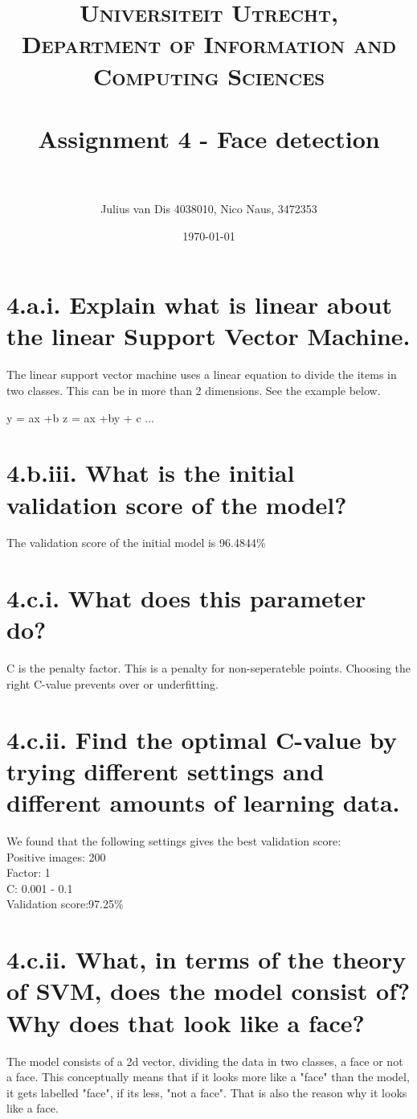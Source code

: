 \documentclass[paper=a4, fontsize=11pt]{scrartcl} %
\title{	
\normalfont \normalsize 
\textsc{Universiteit Utrecht, Department of Information and Computing Sciences} \\ [25pt] %
\horrule{0.5pt} \\[0.4cm] %
\huge Assignment 4 - Face detection \\ %
\horrule{2pt} \\[0.5cm] %
}
\author{Julius van Dis 4038010, Nico Naus, 3472353} %
\date{\normalsize\today} %
\numberwithin{equation}{section} %
\numberwithin{figure}{section} %
\numberwithin{table}{section} %
\begin{document}
\maketitle %

\section*{4.a.i. Explain what is linear about the linear Support Vector Machine.}
The linear support vector machine uses a linear equation to divide the items in two classes. This can be in more than 2 dimensions. See the example below.

y = ax +b
z = ax +by + c
...
\section*{4.b.iii. What is the initial validation score of the model?}
The validation score of the initial model is 96.4844\%
\section*{4.c.i. What does this parameter do?}
C is the penalty factor. This is a penalty for non-seperateble points. Choosing the right C-value prevents over or underfitting.
\section*{4.c.ii. Find the optimal C-value by trying different settings and different amounts of learning data.}
We found that the following settings gives the best validation score:\\
Positive images: 200\\
Factor: 1\\
C: 0.001 - 0.1\\
Validation score:97.25\% \\
\section*{4.c.ii. What, in terms of the theory of SVM, does the model consist of? Why does that look like a face?}
The model consists of a 2d vector, dividing the data in two classes, a face or not a face. This conceptually means that if it looks more like a "face" than the model, it gets labelled "face", if its less, "not a face". That is also the reason why it looks like a face.
\end{document}
